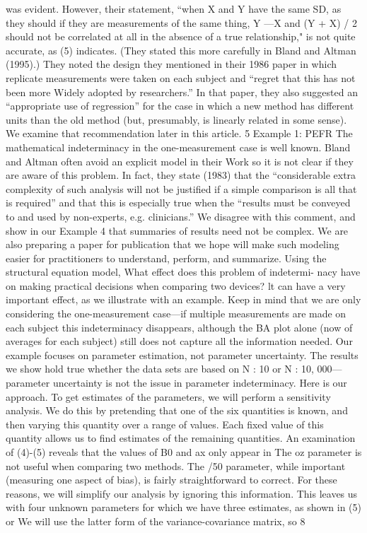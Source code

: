 was evident. However, their statement, “when X and Y have the same SD, as they
should if they are measurements of the same thing, Y —X and (Y + X) / 2 should not
be correlated at all in the absence of a true relationship," is not quite accurate, as
(5) indicates. (They stated this more carefully in Bland and Altman (1995).) They
noted the design they mentioned in their 1986 paper in which replicate measurements
were taken on each subject and “regret that this has not been more Widely adopted
by researchers.”
In that paper, they also suggested an “appropriate use of regression” for the case
in which a new method has different units than the old method (but, presumably,
is linearly related in some sense). We examine that recommendation later in this
article.
5 Example 1: PEFR
The mathematical indeterminacy in the one-measurement case is well known. Bland
and Altman often avoid an explicit model in their Work so it is not clear if they
are aware of this problem. In fact, they state (1983) that the “considerable extra
complexity of such analysis will not be justified if a simple comparison is all that is
required” and that this is especially true when the “results must be conveyed to and
used by non-experts, e.g. clinicians.” We disagree with this comment, and show in
our Example 4 that summaries of results need not be complex. We are also preparing
a paper for publication that we hope will make such modeling easier for practitioners
to understand, perform, and summarize.
Using the structural equation model, What effect does this problem of indetermi-
nacy have on making practical decisions when comparing two devices? lt can have
a very important effect, as we illustrate with an example. Keep in mind that we
are only considering the one-measurement case—if multiple measurements are made
on each subject this indeterminacy disappears, although the BA plot alone (now of
averages for each subject) still does not capture all the information needed.
Our example focuses on parameter estimation, not parameter uncertainty. The
results we show hold true whether the data sets are based on N : 10 or N : 10, 000—
parameter uncertainty is not the issue in parameter indeterminacy.
Here is our approach. To get estimates of the parameters, we will perform a
sensitivity analysis. We do this by pretending that one of the six quantities is known,
and then varying this quantity over a range of values. Each ﬁxed value of this quantity
allows us to ﬁnd estimates of the remaining quantities.
An examination of (4)-(5) reveals that the values of B0 and ax only appear in 
The oz parameter is not useful when comparing two methods. The /50 parameter,
while important (measuring one aspect of bias), is fairly straightforward to correct.
For these reasons, we will simplify our analysis by ignoring this information. This
leaves us with four unknown parameters for which we have three estimates, as shown
in (5) or  We will use the latter form of the variance-covariance matrix, so
8



